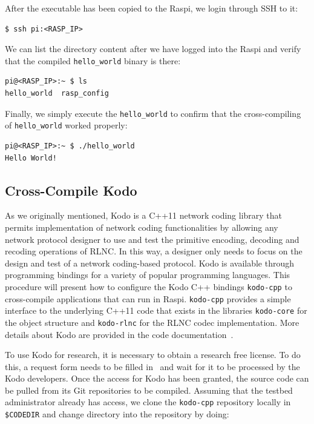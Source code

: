 \documentclass[electronics,article,accept,moreauthors,pdftex,10pt,a4paper]{mdpi}
\theoremstyle{mdpi}
\newcounter{ex}
\newcounter{re}
\theoremstyle{mdpidefinition}
\begin{document}

After the executable has been copied to the Raspi, we login through
SSH to it:

\begin{lstlisting}[]
$ ssh pi:<RASP_IP>
\end{lstlisting}
\FloatBarrier
\vspace{-5mm}

We can list the directory content after we have logged into the Raspi and
verify that the compiled \texttt{hello\_world} binary is there:

\begin{lstlisting}[]
pi@<RASP_IP>:~ $ ls
hello_world  rasp_config
\end{lstlisting}
\FloatBarrier
\vspace{-5mm}

Finally, we simply execute the \texttt{hello\_world} to confirm that
the cross-compiling of \texttt{hello\_world} worked properly:

\begin{lstlisting}[]
pi@<RASP_IP>:~ $ ./hello_world
Hello World!
\end{lstlisting}
\FloatBarrier
\vspace{-5mm}

\subsection{Cross-Compile Kodo}

As we originally mentioned, Kodo is a C++11 network coding library that
permits implementation of network coding functionalities by allowing any network
protocol designer to use and test the primitive encoding, decoding and
recoding operations of RLNC. In this way, a designer only needs to
focus on the design and test of a network coding-based protocol. Kodo is
available through programming bindings for a variety of popular
programming languages. This procedure will present how to configure the
Kodo C++ bindings \texttt{kodo-cpp} to cross-compile applications that can
run in Raspi. \texttt{kodo-cpp} provides a simple interface to the
underlying C++11 code that exists in the libraries \texttt{kodo-core} for
the object structure and \texttt{kodo-rlnc} for the RLNC codec
implementation. More details about Kodo are provided in the code
documentation~\cite{kodocppdoc}.

To use Kodo for research, it is necessary to obtain a research free license.
To do this, a request form needs to be filled
in~\cite{steinwurflicenselink} and wait for it to be processed by the Kodo
developers. Once
the access for Kodo has been granted, the source code can be pulled from
its Git repositories to be compiled. Assuming that the testbed
administrator already has access, we clone the \texttt{kodo-cpp}
repository locally in \texttt{\${CODEDIR}} and change directory into
the repository by doing:
\end{document}
